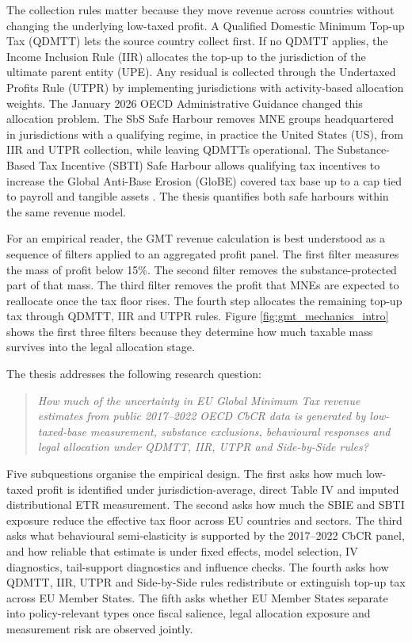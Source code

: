 \documentclass[11pt,a4paper]{article}
\begin{document}
The collection rules matter because they move revenue across countries without changing the underlying low-taxed profit. A Qualified Domestic Minimum Top-up Tax (QDMTT) lets the source country collect first. If no QDMTT applies, the Income Inclusion Rule (IIR) allocates the top-up to the jurisdiction of the ultimate parent entity (UPE). Any residual is collected through the Undertaxed Profits Rule (UTPR) by implementing jurisdictions with activity-based allocation weights. The January 2026 OECD Administrative Guidance changed this allocation problem. The SbS Safe Harbour removes MNE groups headquartered in jurisdictions with a qualifying regime, in practice the United States (US), from IIR and UTPR collection, while leaving QDMTTs operational. The Substance-Based Tax Incentive (SBTI) Safe Harbour allows qualifying tax incentives to increase the Global Anti-Base Erosion (GloBE) covered tax base up to a cap tied to payroll and tangible assets \citep{oecd2026}. The thesis quantifies both safe harbours within the same revenue model.

For an empirical reader, the GMT revenue calculation is best understood as a sequence of filters applied to an aggregated profit panel. The first filter measures the mass of profit below 15\%. The second filter removes the substance-protected part of that mass. The third filter removes the profit that MNEs are expected to reallocate once the tax floor rises. The fourth step allocates the remaining top-up tax through QDMTT, IIR and UTPR rules. Figure \ref{fig:gmt_mechanics_intro} shows the first three filters because they determine how much taxable mass survives into the legal allocation stage.

The thesis addresses the following research question:

\begin{quote}
\textit{How much of the uncertainty in EU Global Minimum Tax revenue estimates from public 2017--2022 OECD CbCR data is generated by low-taxed-base measurement, substance exclusions, behavioural responses and legal allocation under QDMTT, IIR, UTPR and Side-by-Side rules?}
\end{quote}

Five subquestions organise the empirical design. The first asks how much low-taxed profit is identified under jurisdiction-average, direct Table IV and imputed distributional ETR measurement. The second asks how much the SBIE and SBTI exposure reduce the effective tax floor across EU countries and sectors. The third asks what behavioural semi-elasticity is supported by the 2017--2022 CbCR panel, and how reliable that estimate is under fixed effects, model selection, IV diagnostics, tail-support diagnostics and influence checks. The fourth asks how QDMTT, IIR, UTPR and Side-by-Side rules redistribute or extinguish top-up tax across EU Member States. The fifth asks whether EU Member States separate into policy-relevant types once fiscal salience, legal allocation exposure and measurement risk are observed jointly.
\end{document}
